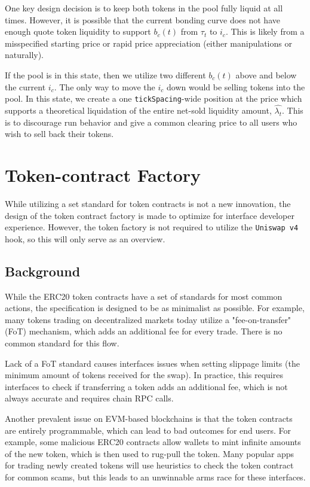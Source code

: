 \documentclass[sigconf,nonacm,prologue,table]{acmart}
\numberwithin{equation}{section}
\theoremstyle{definition}
\theoremstyle{remark}
\begin{document}
One key design decision is to keep both tokens in the pool fully liquid at all times. However, it is possible that the current bonding curve does not have enough quote token liquidity to support $b_c(t)$ from $\tau_t$ to $i_c$. This is likely from a misspecified starting price or rapid price appreciation (either manipulations or naturally). 

If the pool is in this state, then we utilize two different $b_c(t)$ above and below the current $i_c$. The only way to move the $i_c$ down would be selling tokens into the pool. In this state, we create a one \verb|tickSpacing|-wide position at the price which supports a theoretical liquidation of the entire net-sold liquidity amount, $\hat{\lambda_t}$. This is to discourage run behavior and give a common clearing price to all users who wish to sell back their tokens.

\section{Token-contract Factory}

While utilizing a set standard for token contracts is not a new innovation, the design of the token contract factory is made to optimize for interface developer experience. However, the token factory is not required to utilize the \verb|Uniswap v4| hook, so this will only serve as an overview.

\subsection{Background}
While the ERC20 token contracts have a set of standards for most common actions, the specification is designed to be as minimalist as possible. For example, many tokens trading on decentralized markets today utilize a "fee-on-transfer" (FoT) mechanism, which adds an additional fee for every trade. There is no common standard for this flow.

Lack of a FoT standard causes interfaces issues when setting slippage limits (the minimum amount of tokens received for the swap). In practice, this requires interfaces to check if transferring a token adds an additional fee, which is not always accurate and requires chain RPC calls.

Another prevalent issue on EVM-based blockchains is that the token contracts are entirely programmable, which can lead to bad outcomes for end users. For example, some malicious ERC20 contracts allow wallets to mint infinite amounts of the new token, which is then used to rug-pull the token. Many popular apps for trading newly created tokens will use heuristics to check the token contract for common scams, but this leads to an unwinnable arms race for these interfaces. 
\end{document}
